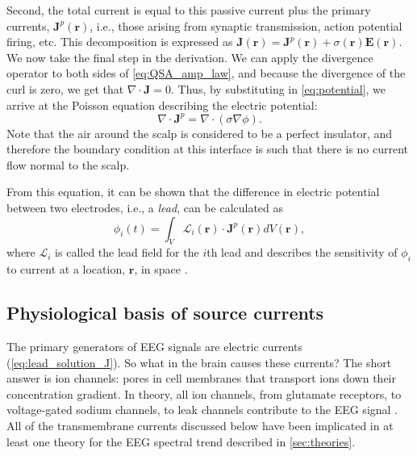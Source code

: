 Second, the total current is equal to this passive current plus the primary currents, $\bm{J}^p(\bm{r})$, i.e., those arising from synaptic transmission, action potential firing, etc.\cite{RevModPhys.65.413} This decomposition is expressed as $\bm{J}(\bm{r}) = \bm{J}^p(\bm{r}) + \sigma(\bm{r}) \bm{E}(\bm{r})$. We now take the final step in the derivation. We can apply the divergence operator to both sides of \ref{eq:QSA_amp_law}, and because the divergence of the curl is zero, we get that $\nabla \cdot \bm{J} = 0$. Thus, by substituting in \ref{eq:potential}, we arrive at the Poisson equation describing the electric potential:
\begin{equation} \label{eq:poisson}
    \nabla \cdot \bm{J}^p = \nabla \cdot \left(\sigma \nabla \phi \right)\mathrm{.}
\end{equation}
Note that the air around the scalp is considered to be a perfect insulator, and therefore the boundary condition at this interface is such that there is no current flow normal to the scalp. 

From this equation, it can be shown that the difference in electric potential between two electrodes, i.e., a \textit{lead}, can be calculated as \cite{RevModPhys.65.413}
\begin{equation} \label{eq:lead_solution_J}
    \phi_i(t) = \int_V \mathcal{L}_i(\bm{r}) \cdot \bm{J}^p(\bm{r}) dV(\bm{r})\mathrm{,}
\end{equation}
where $\mathcal{L}_i$ is called the lead field for the $i$th lead  and describes the sensitivity of $\phi_i$ to current at a location, $\bm{r}$, in space \cite{Malmivuo1995}. 

\subsection{Physiological basis of source currents}
The primary generators of EEG signals are electric currents (\ref{eq:lead_solution_J}). So what in the brain causes these currents? The short answer is ion channels: pores in cell membranes that transport ions down their concentration gradient. In theory, all ion channels, from glutamate receptors, to voltage-gated sodium channels, to leak channels contribute to the EEG signal \cite{Buzsaki2012}. All of the transmembrane currents discussed below have been implicated in at least one theory for the EEG spectral trend described in \autoref{sec:theories}.

